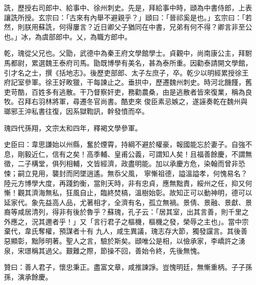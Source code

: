 \begin{pinyinscope}
 詵，歷授右司郎中、給事中、徐州刺史。先是，拜給事中時，頲為中書侍郎，上表讓詵所授。玄宗曰：「古來有內舉不避親乎？」頲曰：「晉祁奚是也。」玄宗曰：「若然，則朕用蘇詵，何得屢言？近日卿父子猶同在中書，兄弟有何不得？卿言非至公也。」冰，為虞部郎中。乂，為職方郎中。



 乾，瑰從父兄也。父勖，武德中為秦王府文學館學士。貞觀中，尚南康公主，拜駙馬都尉，累選魏王泰府司馬。勖既博學有美名，甚為泰所重。因勸泰請開文學館，引才名之士，撰《括地志》。後歷吏部郎、太子左庶子，卒。乾少以明經累授徐王府記室參軍。徐王好畋獵，干每諫止之。垂拱中，歷遷魏州刺史。時河北饑饉，舊吏苛酷，百姓多有逃散。干乃督察奸吏，務勸農桑，由是逃散者皆來復業，稱為良牧。召拜右羽林將軍，尋遷冬官尚書。酷吏來
 俊臣素忌嫉之，遂誣奏乾在魏州與瑯邪王沖私書往復，因系獄鞫訊，幹發憤而卒。



 瑰四代孫翔，文宗太和四年，釋褐文學參軍。



 史臣曰：韋思謙始以州縣，奮於煙霄，持綱不避於權豪，報國能忘於妻子。自強不息，剛毅近仁，信有之矣！高季輔、皇甫公義，可謂知人矣！且福善餘慶，不謂無徵，二子構堂，俱列相輔，文皆經濟，政盡明能。加以承慶方危，染翰而曾非恐悚；嗣立見用，襲封而罔墜逍遙。無忝父風，
 寧慚祖德，謚溫謚孝，何愧易名？陸元方博學大度，再踐鈞衡，當則天時，非有忠貞，應無黜責，綏州之任，抑又何慚！觀其濟海無私，狂風自止，臨終焚槁，溫樹始彰。故知正可以動神明，德可以延家代。象先益高人品，尤著相才，全濟有名，孤立無禍。景倩、景融、景獻、景裔等咸居清列，得非有後於魯乎？蘇瑰，孔子云：「居其室，出其言善，則千里之外應之，況其邇者乎！」又「言行君子之樞機，樞機之發，榮辱之主也」。當中宗棄代，韋氏奪權，預謀者十有
 九人，咸生異議，瑰志存大節，獨發讜言。其後善惡顯彰，黜陟明著。聖人之言，驗於斯矣。頲唯公是相，以儉承家，李嶠許之湧泉，宋璟稱其過父。艱難之際，節操不回，善始令終，先後無愧。



 贊曰：善人君子，懷忠秉正。盡富文章，咸推諫諍。豈愧明廷，無慚重柄。子子孫孫，演承餘慶。



\end{pinyinscope}